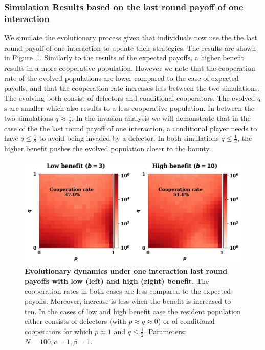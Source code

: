 \documentclass[11pt]{article}
\theoremstyle{plainCl1}
\theoremstyle{plainCl2}
\begin{document}
\subsubsection*{Simulation Results based on the last round payoff of one interaction}

We simulate the evolutionary process given that individuals now use the the last
round payoff of one interaction to update their strategies. The results are
shown in Figure~\ref{fig:one_interaction_last_round_payoffs_results}. Similarly
to the results of the expected payoffs, a higher benefit results in a more
cooperative population. However we note that the cooperation rate of the evolved
populations are lower compared to the case of expected payoffs, and that the
cooperation rate increases less between the two simulations. The evolving both
consist of defectors and conditional cooperators. The evolved \(q\)s are smaller
which also results to a less cooperative population. In between the two
simulations \(q \approx \frac{1}{2}\). In the invasion analysis we will
demonstrate that in the case of the the last round payoff of one interaction, a
conditional player needs to have \(q \leq \frac{1}{2}\) to avoid being invaded
by a defector. In both simulations \(q \leq \frac{1}{2}\), the higher benefit
pushes the evolved population closer to the bounty.

\begin{figure}[!htbp]
  \centering 
  \includegraphics[width=.70\textwidth]{static/one_interaction_last_round_donation_game.pdf}
  \caption{\textbf{Evolutionary dynamics under one interaction last round
  payoffs with low (left) and high (right) benefit.} The cooperation rates
  in both cases are less compared to the expected payoffs. Moreover, increase is
  less when the benefit is increased to ten. In the cases of low and
  high benefit case the resident population either consists of defectors (with
  \(p \approx q \approx 0\)) or of conditional cooperators for which \(p \approx
  1\) and \(q \leq \frac{1}{2}\). Parameters: \(N =100, c=1, \beta=1\).
  }\label{fig:one_interaction_last_round_payoffs_results}
\end{figure}
\end{document}
